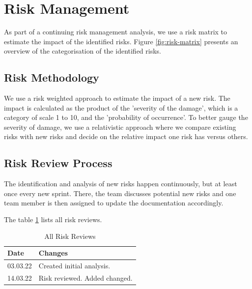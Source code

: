 \section{Risk Management}

As part of a continuing risk management analysis, we use a risk matrix to estimate the impact of the identified risks.\newline
Figure \ref{fig:risk-matrix} presents an overview of the categorisation of the identified risks.

\subsection{Risk Methodology}
We use a risk weighted approach to estimate the impact of a new risk. The impact is calculated as the product of the 'severity of the damage', which is a category of scale 1 to 10, and the 'probability of occurrence'. To better gauge the severity of damage, we use a relativistic approach where we compare existing risks with new risks and decide on the relative impact one risk has versus others.

\subsection{Risk Review Process}
The identification and analysis of new risks happen continuously, but at least once every new sprint. There, the team discusses potential new risks and one team member is then assigned to update the documentation accordingly.

The table \ref{tab:risk-review} lists all risk reviews.

\begin{table}[h!]
\centering
  \caption{\label{tab:risk-review}All Risk Reviews}
  \begin{tabular}{ | l | l | }
    \hline
    \textbf{Date} & \textbf{Changes} \\
    \hline
    03.03.22 & Created initial analysis. \\
    \hline
    14.03.22 & Risk reviewed. Added  changed. \\
    \hline
  \end{tabular}
\end{table}


